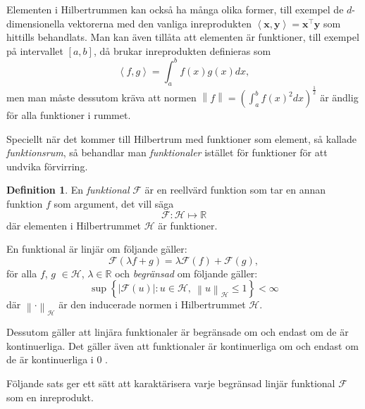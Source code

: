 \documentclass[a4paper, 12pt]{report}
\theoremstyle{definition}
\newtheorem{defi}{Definition}[section]
\theoremstyle{remark}
\begin{document}
Elementen i Hilbertrummen kan också ha många olika former, till exempel de $d$-dimensionella vektorerna med den vanliga inreprodukten $\left\langle \mathbf{x}, \mathbf{y} \right\rangle = \mathbf{x}^\intercal\mathbf{y}$ som hittills behandlats. Man kan även tillåta att elementen är funktioner, till exempel på intervallet $\left[a,b\right]$, då brukar inreprodukten definieras som
\begin{equation*}
	\left\langle f, g \right\rangle=\int_{a}^{b}f(x)g(x) dx,
\end{equation*}
men man måste dessutom kräva att normen $\left\|f\right\| = \left(\int_{a}^{b}f(x)^2dx\right)^{\frac{1}{2}}$ är ändlig för alla funktioner i rummet.

Speciellt när det kommer till Hilbertrum med funktioner som element, så kallade \emph{funktionsrum}, så behandlar man \emph{funktionaler} istället för funktioner för att undvika förvirring.
\begin{defi}
	En \emph{funktional} $\mathcal{F}$ är en reellvärd funktion som tar en annan funktion $f$ som argument, det vill säga
	\begin{equation*}
		\mathcal{F}: \mathcal{H} \longmapsto \mathbb{R}
	\end{equation*}
	där elementen i Hilbertrummet $\mathcal{H}$ är funktioner.
\end{defi}

En funktional är linjär om följande gäller:
\begin{equation*}
	\mathcal{F}(\lambda f+g) = \lambda\mathcal{F}(f) + \mathcal{F}(g),
\end{equation*}
för alla $f$, $g$ $\in \mathcal{H}$, $\lambda \in \mathbb{R}$ och \emph{begränsad} om följande gäller:
\begin{equation*}
	\sup \left\{\left| \mathcal{F}(u) \right| : u\in\mathcal{H},~\left\| u \right\|_{\mathcal{H}} \leq 1 \right\} < \infty
\end{equation*}
där $\left\| \cdot \right\|_ \mathcal{H}$ är den inducerade normen i Hilbertrummet $\mathcal{H}$.

Dessutom gäller att linjära funktionaler är begränsade om och endast om de är kontinuerliga. Det gäller även att funktionaler är kontinuerliga om och endast om de är kontinuerliga i 0 \cite{Young}.

Följande sats ger ett sätt att karaktärisera varje begränsad linjär funktional $\mathcal{F}$ som en inreprodukt.
\end{document}
